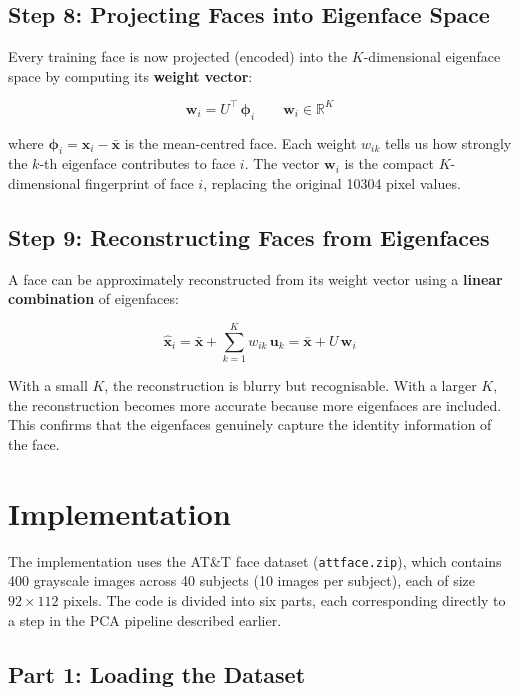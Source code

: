 \documentclass[12pt,a4paper]{article}
\begin{document}
\subsection{Step 8: Projecting Faces into Eigenface Space}

Every training face is now projected (encoded) into the $K$-dimensional eigenface
space by computing its \textbf{weight vector}:

\[
\mathbf{w}_i = U^\top\, \boldsymbol{\phi}_i \qquad \mathbf{w}_i \in \mathbb{R}^K
\]

where $\boldsymbol{\phi}_i = \mathbf{x}_i - \bar{\mathbf{x}}$ is the mean-centred
face. Each weight $w_{ik}$ tells us how strongly the $k$-th eigenface contributes
to face $i$. The vector $\mathbf{w}_i$ is the compact $K$-dimensional fingerprint
of face $i$, replacing the original 10304 pixel values.

\subsection{Step 9: Reconstructing Faces from Eigenfaces}

A face can be approximately reconstructed from its weight vector using a
\textbf{linear combination} of eigenfaces:

\[
\hat{\mathbf{x}}_i = \bar{\mathbf{x}} + \sum_{k=1}^{K} w_{ik}\, \mathbf{u}_k
= \bar{\mathbf{x}} + U\,\mathbf{w}_i
\]

With a small $K$, the reconstruction is blurry but recognisable. With a larger
$K$, the reconstruction becomes more accurate because more eigenfaces are
included. This confirms that the eigenfaces genuinely capture the identity
information of the face.





\section{Implementation}

The implementation uses the AT\&T face dataset (\texttt{attface.zip}), which
contains 400 grayscale images across 40 subjects (10 images per subject),
each of size $92 \times 112$ pixels. The code is divided into six parts,
each corresponding directly to a step in the PCA pipeline described earlier.

\subsection{Part 1: Loading the Dataset}
\end{document}
